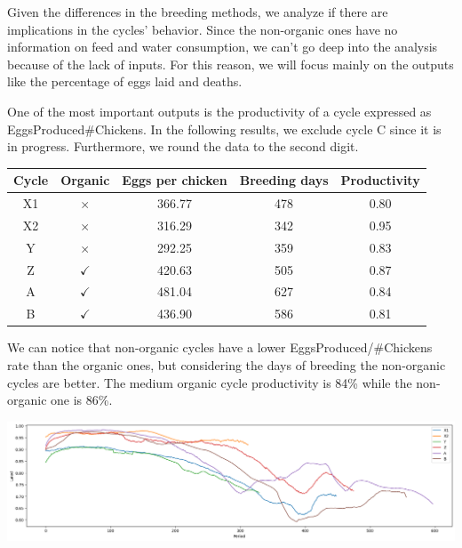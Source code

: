 \documentclass[11pt]{article}
\begin{document}
Given the differences in the breeding methods, we analyze if there are implications in the cycles' behavior. Since the non-organic ones have no information on feed and water consumption, we can't go
deep into the analysis because of the lack of inputs. For this reason, we will focus mainly on the outputs like the percentage of eggs laid and deaths.

One of the most important outputs is the productivity of a cycle expressed as EggsProduced\/\#Chickens. In the following results, we exclude cycle C since it is in progress. Furthermore, we round the
data to the second digit.

\begin{center}
    \begin{tabular}{| c | c | c | c | c |}
        \hline
        Cycle & Organic      & Eggs per chicken & Breeding days & Productivity \\ [0.5ex]
        \hline
        X1    & $\times$     & 366.77           & 478           & 0.80         \\ [0.5ex]
        \hline
        X2    & $\times$     & 316.29           & 342           & 0.95         \\ [0.5ex]
        \hline
        Y     & $\times$     & 292.25           & 359           & 0.83         \\ [0.5ex]
        \hline
        Z     & $\checkmark$ & 420.63           & 505           & 0.87         \\ [0.5ex]
        \hline
        A     & $\checkmark$ & 481.04           & 627           & 0.84         \\ [0.5ex]
        \hline
        B     & $\checkmark$ & 436.90           & 586           & 0.81         \\ [0.5ex]
        \hline
    \end{tabular}
\end{center}

We can notice that non-organic cycles have a lower EggsProduced/\#Chickens rate than the organic ones, but considering the days of breeding the non-organic cycles are better.
The medium organic cycle productivity is 84\% while the non-organic one is 86\%.

\includegraphics[width=\linewidth]{../Results/OrganingOrNot/Laid.png}
\end{document}
